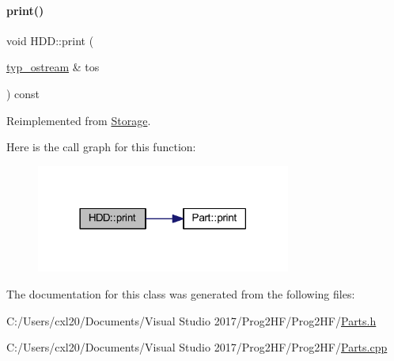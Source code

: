 \paragraph{\texorpdfstring{print()}{print()}\hspace{0.1cm}{\footnotesize\ttfamily [4/4]}}
{\footnotesize\ttfamily void H\+D\+D\+::print (\begin{DoxyParamCaption}\item[{\mbox{\hyperlink{structtyp__ostream}{typ\+\_\+ostream}} \&}]{tos }\end{DoxyParamCaption}) const\hspace{0.3cm}{\ttfamily [virtual]}}



Reimplemented from \mbox{\hyperlink{class_storage_ad6c13f251a39612a7628980bf2f12918}{Storage}}.

Here is the call graph for this function\+:
\nopagebreak
\begin{figure}[H]
\begin{center}
\leavevmode
\includegraphics[width=237pt]{class_h_d_d_a557271f835f56a25fe5c264019f20bb2_cgraph}
\end{center}
\end{figure}


The documentation for this class was generated from the following files\+:\begin{DoxyCompactItemize}
\item 
C\+:/\+Users/cxl20/\+Documents/\+Visual Studio 2017/\+Prog2\+H\+F/\+Prog2\+H\+F/\mbox{\hyperlink{_parts_8h}{Parts.\+h}}\item 
C\+:/\+Users/cxl20/\+Documents/\+Visual Studio 2017/\+Prog2\+H\+F/\+Prog2\+H\+F/\mbox{\hyperlink{_parts_8cpp}{Parts.\+cpp}}\end{DoxyCompactItemize}
